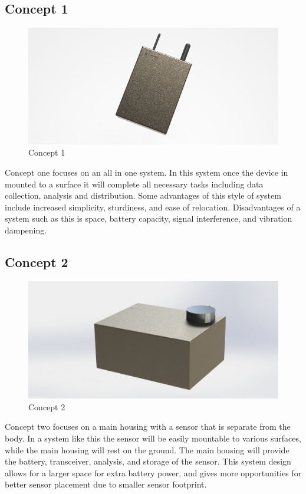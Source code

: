 \documentclass[12pt]{article}
\begin{document}
\subsection{Concept 1}
\begin{figure}[ht!]
	\centering
	\includegraphics[width=1\textwidth]{model1.jpg}
	\caption{Concept 1}
	\label{fig:concept1}
\end{figure}
Concept one focuses on an all in one system. In this system once the device in mounted to a surface it will complete all necessary tasks including data collection, analysis and distribution.
Some advantages of this style of system include increased simplicity, sturdiness, and ease of relocation.
Disadvantages of a system such as this is space, battery capacity, signal interference, and vibration dampening.

\subsection{Concept 2}
\begin{figure}[ht!]
	\centering
	\includegraphics[width=1\textwidth]{model2.jpg}
	\caption{Concept 2}
	\label{fig:concept2}
\end{figure}
Concept two focuses on a main housing with a sensor that is separate from the body. In a system like this the sensor will be easily mountable to various surfaces, while the main housing will rest on the ground. The main housing will provide the battery, transceiver, analysis, and storage of the sensor. This system design allows for a larger space for extra battery power, and gives more opportunities for better sensor placement due to smaller sensor footprint.
\end{document}
